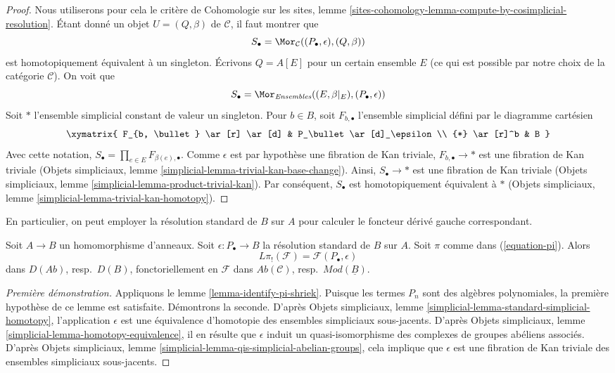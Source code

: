 \begin{proof}
Nous utiliserons pour cela le critère de Cohomologie sur les sites, lemme
\ref{sites-cohomology-lemma-compute-by-cosimplicial-resolution}.
Étant donné un objet $U = (Q, \beta)$ de $\mathcal{C}$, il faut montrer que
$$
S_\bullet = \Mor_\mathcal{C}((P_\bullet, \epsilon), (Q, \beta))
$$
est homotopiquement équivalent à un singleton.
Écrivons $Q = A[E]$ pour un certain ensemble $E$ (ce qui est possible par
notre choix de la catégorie $\mathcal{C}$). On voit que
$$
S_\bullet = \Mor_{\textit{Ensembles}}((E, \beta|_E), (P_\bullet, \epsilon))
$$
Soit $*$ l'ensemble simplicial constant de valeur un singleton. Pour $b \in B$,
soit $F_{b, \bullet}$ l'ensemble simplicial défini par le diagramme cartésien
$$
\xymatrix{
F_{b, \bullet} \ar[r] \ar[d] & P_\bullet \ar[d]_\epsilon \\
{*} \ar[r]^b & B
}
$$
Avec cette notation, $S_\bullet = \prod_{e \in E} F_{\beta(e), \bullet}$.
Comme $\epsilon$ est par hypothèse une fibration de Kan triviale,
$F_{b, \bullet} \to *$ est une fibration de Kan triviale
(Objets simpliciaux, lemme
\ref{simplicial-lemma-trivial-kan-base-change}). Ainsi,
$S_\bullet \to *$ est une fibration de Kan triviale (Objets simpliciaux,
lemme \ref{simplicial-lemma-product-trivial-kan}). Par conséquent,
$S_\bullet$ est homotopiquement équivalent à $*$ (Objets simpliciaux, lemme
\ref{simplicial-lemma-trivial-kan-homotopy}).
\end{proof}

\noindent
En particulier, on peut employer la résolution standard de $B$ sur $A$ pour
calculer le foncteur dérivé gauche correspondant.

\begin{lemma}
\label{lemma-pi-shriek-standard}
Soit $A \to B$ un homomorphisme d'anneaux. Soit
$\epsilon : P_\bullet \to B$ la résolution standard de $B$ sur $A$.
Soit $\pi$ comme dans (\ref{equation-pi}). Alors
$$
L\pi_!(\mathcal{F}) = \mathcal{F}(P_\bullet, \epsilon)
$$
dans $D(\textit{Ab})$, resp.\ $D(B)$, fonctoriellement en $\mathcal{F}$ dans
$\textit{Ab}(\mathcal{C})$, resp.\ $\textit{Mod}(\underline{B})$.
\end{lemma}

\begin{proof}[Première démonstration]
Appliquons le lemme \ref{lemma-identify-pi-shriek}.
Puisque les termes $P_n$ sont des algèbres polynomiales, la première hypothèse
de ce lemme est satisfaite. Démontrons la seconde. D'après Objets simpliciaux,
lemme \ref{simplicial-lemma-standard-simplicial-homotopy}, l'application
$\epsilon$ est une équivalence d'homotopie des ensembles simpliciaux
sous-jacents. D'après Objets simpliciaux, lemme
\ref{simplicial-lemma-homotopy-equivalence}, il en résulte que $\epsilon$
induit un quasi-isomorphisme des complexes de groupes abéliens associés.
D'après Objets simpliciaux, lemme
\ref{simplicial-lemma-qis-simplicial-abelian-groups}, cela implique que
$\epsilon$ est une fibration de Kan triviale des ensembles simpliciaux
sous-jacents.
\end{proof}

